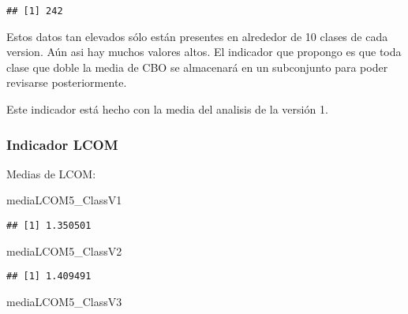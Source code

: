 \documentclass[
]{article}
\newenvironment{Shaded}{\begin{snugshade}}{\end{snugshade}}
\newcommand{\DecValTok}[1]{\textcolor[rgb]{0.00,0.00,0.81}{#1}}
\newcommand{\NormalTok}[1]{#1}
\newcommand{\OtherTok}[1]{\textcolor[rgb]{0.56,0.35,0.01}{#1}}
\newcommand{\SpecialCharTok}[1]{\textcolor[rgb]{0.00,0.00,0.00}{#1}}
\begin{document}
\begin{verbatim}
## [1] 242
\end{verbatim}

Estos datos tan elevados sólo están presentes en alrededor de 10 clases
de cada version. Aún asi hay muchos valores altos. El indicador que
propongo es que toda clase que doble la media de CBO se almacenará en un
subconjunto para poder revisarse posteriormente.

Este indicador está hecho con la media del analisis de la versión 1.

\begin{Shaded}
\end{Shaded}

\hypertarget{indicador-lcom}{%
\subsubsection{Indicador LCOM}\label{indicador-lcom}}

Medias de LCOM:

\begin{Shaded}
\begin{Highlighting}[]
\NormalTok{mediaLCOM5\_ClassV1}
\end{Highlighting}
\end{Shaded}

\begin{verbatim}
## [1] 1.350501
\end{verbatim}

\begin{Shaded}
\begin{Highlighting}[]
\NormalTok{mediaLCOM5\_ClassV2}
\end{Highlighting}
\end{Shaded}

\begin{verbatim}
## [1] 1.409491
\end{verbatim}

\begin{Shaded}
\begin{Highlighting}[]
\NormalTok{mediaLCOM5\_ClassV3}
\end{Highlighting}
\end{Shaded}
\end{document}
